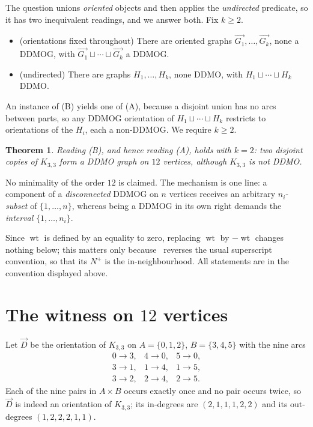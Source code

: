 \documentclass[11pt]{amsart}
\newtheorem{theorem}{Theorem}
\DeclareMathOperator{\wt}{wt}
\newcommand{\ora}[1]{\overrightarrow{#1}}
\begin{document}
The question unions \emph{oriented} objects and then applies the \emph{undirected} predicate,
so it has two inequivalent readings, and we answer both. Fix $k\ge 2$.
\begin{itemize}
\item[\textbf{(A)}] (orientations fixed throughout) There are oriented graphs
$\ora{G_1},\dots,\ora{G_k}$, none a DDMOG, with $\ora{G_1}\sqcup\cdots\sqcup\ora{G_k}$ a DDMOG.
\item[\textbf{(B)}] (undirected) There are graphs $H_1,\dots,H_k$, none DDMO, with
$H_1\sqcup\cdots\sqcup H_k$ DDMO.
\end{itemize}
An instance of (B) yields one of (A), because a disjoint union has no arcs between parts, so
any DDMOG orientation of $H_1\sqcup\cdots\sqcup H_k$ restricts to orientations of the $H_i$,
each a non-DDMOG. We require $k\ge2$.

\begin{theorem}\label{thm:main}
Reading \textup{(B)}, and hence reading \textup{(A)}, holds with $k=2$: two disjoint copies of
$K_{3,3}$ form a DDMO graph on $12$ vertices, although $K_{3,3}$ is not DDMO.
\end{theorem}

No minimality of the order $12$ is claimed. The mechanism is one line: a component of a
\emph{disconnected} DDMOG on $n$ vertices receives an arbitrary $n_i$-\emph{subset} of
$\{1,\dots,n\}$, whereas being a DDMOG in its own right demands the \emph{interval}
$\{1,\dots,n_i\}$.

Since $\wt$ is defined by an equality to zero, replacing $\wt$ by $-\wt$ changes nothing
below; this matters only because~\cite{Source} reverses the usual superscript convention, so
that its $N^{+}$ is the in-neighbourhood. All statements are in the convention displayed
above.

\section{The witness on $12$ vertices}\label{sec:w12}

Let $\ora{D}$ be the orientation of $K_{3,3}$ on $A=\{0,1,2\}$, $B=\{3,4,5\}$ with the nine
arcs
\[
\begin{array}{lll}
 0\to 3, & 4\to 0, & 5\to 0,\\
 3\to 1, & 1\to 4, & 1\to 5,\\
 3\to 2, & 2\to 4, & 2\to 5.
\end{array}
\]
Each of the nine pairs in $A\times B$ occurs exactly once and no pair occurs twice, so
$\ora{D}$ is indeed an orientation of $K_{3,3}$; its in-degrees are $(2,1,1,1,2,2)$ and its
out-degrees $(1,2,2,2,1,1)$.
\end{document}
